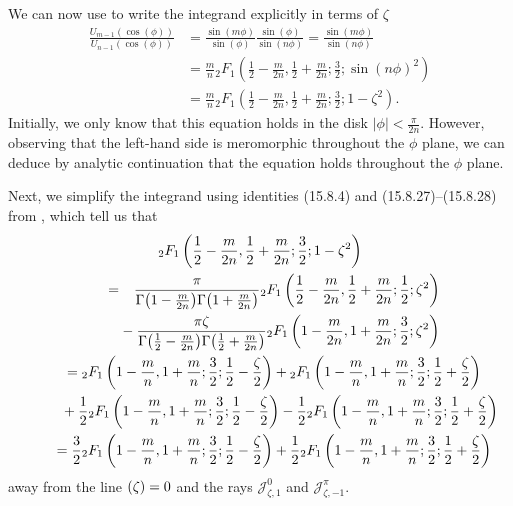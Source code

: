 \documentclass[pdftex]{sigma}
\let\Re\relax
\DeclareMathOperator{\Re}{Re}
\numberwithin{equation}{section}
\begin{document}
We can now use \cite[identity~(15.4.16)]{dlmf} to write the integrand explicitly in terms of $\zeta$
\begin{align*}
\frac{U_{m-1}(\cos(\phi))}{U_{n-1}(\cos(\phi))} &= \frac{\sin(m\phi)}{\sin(\phi)}\frac{\sin(\phi)}{\sin(n \phi)}= \frac{\sin(m\phi)}{\sin(n \phi)}\\
& = \frac{m}{n} {}_2F_1\left(\frac{1}{2} - \frac{m}{2n}, \frac{1}{2} + \frac{m}{2n}; \frac{3}{2}; \sin(n \phi)^2\right) \\
& = \frac{m}{n} {}_2F_1\left(\frac{1}{2} - \frac{m}{2n}, \frac{1}{2} + \frac{m}{2n}; \frac{3}{2}; 1 - \zeta^2\right).
\end{align*}
Initially, we only know that this equation holds in the disk $|\phi| < \frac{\pi}{2n}$. However, observing that the left-hand side is meromorphic throughout the $\phi$ plane, we can deduce by analytic continuation that the equation holds throughout the $\phi$ plane.

Next, we simplify the integrand using identities (15.8.4) and (15.8.27)--(15.8.28) from \cite{dlmf}, which tell us that
\begin{gather*}
{}_2F_1\left(\frac{1}{2} - \frac{m}{2n}, \frac{1}{2} + \frac{m}{2n}; \frac{3}{2}; 1 - \zeta^2\right) \\
\qquad = \hphantom{+} \frac{\pi}{\Gamma\bigl(1-\frac{m}{2n}\bigr) \Gamma\bigl(1 + \frac{m}{2n}\bigr)} {}_2F_1\left(\frac{1}{2} - \frac{m}{2n}, \frac{1}{2} + \frac{m}{2n}; \frac{1}{2}; \zeta^2\right) \\
\qquad\hphantom{=} - \frac{\pi \zeta}{\Gamma\bigl(\frac{1}{2} - \frac{m}{2n}\bigr) \Gamma\bigl(\frac{1}{2} + \frac{m}{2n}\bigr)} {}_2F_1\left(1 - \frac{m}{2n}, 1 + \frac{m}{2n}; \frac{3}{2}; \zeta^2\right) \\
\qquad = {}_2F_1\left(1 - \frac{m}{n}, 1 + \frac{m}{n}; \frac{3}{2}; \frac{1}{2} - \frac{\zeta}{2}\right) + {}_2F_1\left(1-\frac{m}{n}, 1 + \frac{m}{n}; \frac{3}{2}; \frac{1}{2} + \frac{\zeta}{2}\right) \\
\qquad \hphantom{=} + \frac{1}{2} {}_2F_1\left(1-\frac{m}{n}, 1+\frac{m}{n}; \frac{3}{2}; \frac{1}{2} - \frac{\zeta}{2}\right) - \frac{1}{2} {}_2F_1\left(1-\frac{m}{n}, 1 + \frac{m}{n}; \frac{3}{2}; \frac{1}{2} + \frac{\zeta}{2}\right) \\
\qquad = \frac{3}{2} {}_2F_1\left(1 - \frac{m}{n}, 1 + \frac{m}{n}; \frac{3}{2};\frac{1}{2} - \frac{\zeta}{2}\right) + \frac{1}{2} {}_2F_1\left(1 - \frac{m}{n}, 1 + \frac{m}{n}; \frac{3}{2}; \frac{1}{2} + \frac{\zeta}{2}\right)
\end{gather*}
away from the line $\Re(\zeta) = 0$ and the rays $\mathcal{J}^0_{\zeta,1}$ and $\mathcal{J}^\pi_{\zeta,-1}$.
\end{document}
